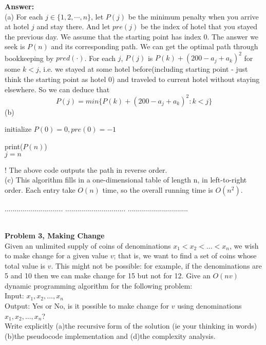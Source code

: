\documentclass{article}
\begin{document}
\noindent
{\bf Answer:}\\

\noindent(a) For each $j\in\{1,2,\cdots,n\}$, let $P(j)$ be the minimum penalty when you arrive at hotel $j$ and stay there. And let $pre(j)$ be the index of hotel that you stayed the previous day. We assume that the starting point has index 0.
The answer we seek is $P(n)$ and its corresponding path. We can get the optimal path through bookkeeping by $pred(\cdot)$. 
For each $j$, $P(j)$ is $P(k)+(200-a_j+a_k)^2$ for some $k<j$, i.e. we stayed at some hotel before(including starting point - just think the starting point as hotel 0) and traveled to current hotel without staying elsewhere. So we can deduce that 
\[ 
P(j)=min\{P(k)+(200-a_j+a_k)^2:k<j\} 
\]
\noindent(b) \\
\begin{algorithm}[H]
	initialize $P(0) = 0, pre(0)=-1$ \\
	
	print($P(n)$)\\
	
	$j=n$\\
\end{algorithm} 
	! The above code outputs the path in reverse order.\\
\noindent(c)
This algorithm fills in a one-dimensional table of length n, in left-to-right order. Each entry take $O(n)$ time, so the overall running time is $O(n^2)$.

\pagebreak
\noindent{\bf  } $.............................$
\noindent{\bf } $..............................$
\noindent{\bf }          $..............................$

\noindent
{}\\

\noindent
{\bf Problem 3, Making Change }\\
Given an unlimited supply of coins of denominations $x_1 < x_2 <  \ldots < x_n$, 
we wish to make change for a given value $v$; 
that is, we want to find a set of coins whose total value is $v$. 
This might not be possible: for example, if the denominations are 5 and 10 
then we can make change for 15 but not for 12. 
Give an $O(nv)$ dynamic programming algorithm for the following problem:\\
Input: $x_1, x_2 , \ldots , x_n$\\
Output: Yes or No, is it possible to make change for $v$ using denominations $x_1, x_2, \ldots , x_n$?\\
Write explicitly (a)the recursive form of the solution (ie your thinking in words) (b)the pseudocode implementation and 
(d)the complexity analysis. \\
\end{document}
